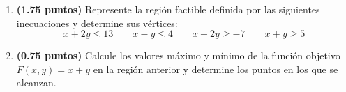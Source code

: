 
\begin{enumerate}[label=\alph*)]
  \item \textbf{(1.75 puntos)} Represente la región factible definida por las
  siguientes inecuaciones y determine sus vértices:
  \[
  x+2y\leq 13\qquad x-y\leq 4\qquad x-2y\geq -7\qquad x+y\geq 5
  \]
  \item \textbf{(0.75 puntos)} Calcule los valores máximo y mínimo de la
  función objetivo $F(x,y)=x+y$ en la región anterior y determine los puntos
  en los que se alcanzan.
\end{enumerate}
